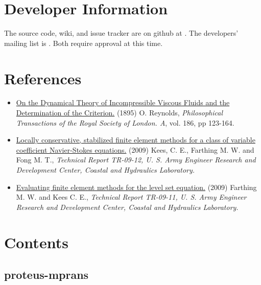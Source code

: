 \documentclass[letterpaper,12pt,english]{sphinxmanual}
\begin{document}
\chapter{Developer Information}
\label{index:developer-information}
The source code, wiki, and issue tracker are on github at
. The developers' mailing list is
. Both require approval at
this time.


\chapter{References}
\label{index:references-sec}\label{index:references}\begin{itemize}
\item {} 
\href{http://www.jstor.org/discover/10.2307/90643?uid=370508371\&uid=3739760\&uid=2\&uid=3\&uid=40171\&uid=67\&uid=62\&uid=3739256\&sid=21102672688353}{On the Dynamical Theory of Incompressible Viscous Fluids and the
Determination of the Criterion.} (1895)
O. Reynolds, \emph{Philosophical Transactions of the Royal Society of London. A}, vol. 186, pp 123-164.

\item {} 
\href{http://www.dtic.mil/cgi-bin/GetTRDoc?AD=ADA508370}{Locally conservative, stabilized finite element methods for a class of variable coefficient Navier-Stokes equations.}
(2009)
Kees,  C. E., Farthing  M. W. and Fong M. T., \emph{Technical Report TR-09-12, U. S. Army Engineer Research and Development Center, Coastal and Hydraulics Laboratory.}

\item {} 
\href{http://acwc.sdp.sirsi.net/client/search/asset/1000817}{Evaluating finite element methods for the level set equation.}
(2009)
Farthing  M. W. and Kees C. E., \emph{Technical Report TR-09-11,  U. S. Army Engineer Research and Development Center, Coastal and Hydraulics Laboratory.}

\end{itemize}


\chapter{Contents}
\label{index:contents}

\section{proteus-mprans}
\label{api/modules::doc}\label{api/modules:proteus-mprans}
\end{document}
